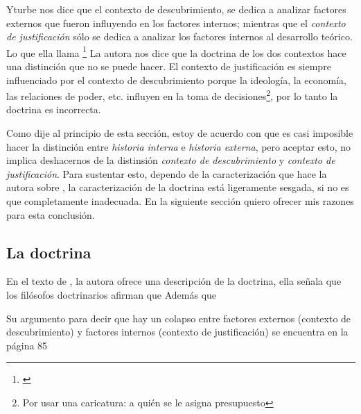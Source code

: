 Yturbe nos dice que el contexto de descubrimiento, se dedica a analizar factores externos que fueron influyendo en los factores internos; mientras que el \emph{contexto de justificación} sólo se dedica a analizar los factores internos al desarrollo teórico.
Lo que ella llama \footnote{
	 \cite[p. 75]{Yturbe1995}
}
La autora nos dice que la doctrina de los dos contextos hace una distinción que no se puede hacer.
El contexto de justificación es siempre influenciado por el contexto de descubrimiento porque la ideología, la economía, las relaciones de poder, etc. influyen en la toma de decisiones\footnote{Por usar una caricatura: a quién se le asigna presupuesto}, por lo tanto la doctrina es incorrecta.

Como dije al principio de esta sección, estoy de acuerdo con que es casi imposible hacer la distinción entre \emph{historia interna} e \emph{historia externa}, pero aceptar esto, no implica deshacernos de la distinsión \emph{contexto de descubrimiento} y \emph{contexto de justificación}.
Para sustentar esto, dependo de la caracterización que hace la autora sobre , la caracterización de la doctrina está ligeramente sesgada, si no es que completamente inadecuada.
En la siguiente sección quiero ofrecer mis razones para esta conclusión.

\subsection{La doctrina}

\noindent En el texto de \textcite[p.75]{Yturbe1995}, la autora ofrece una descripción de la doctrina, ella señala que los filósofos doctrinarios afirman que 
Además que 


Su argumento para decir que hay un colapso entre factores externos (contexto de descubrimiento) y factores internos (contexto de justificación) se encuentra en la página 85

